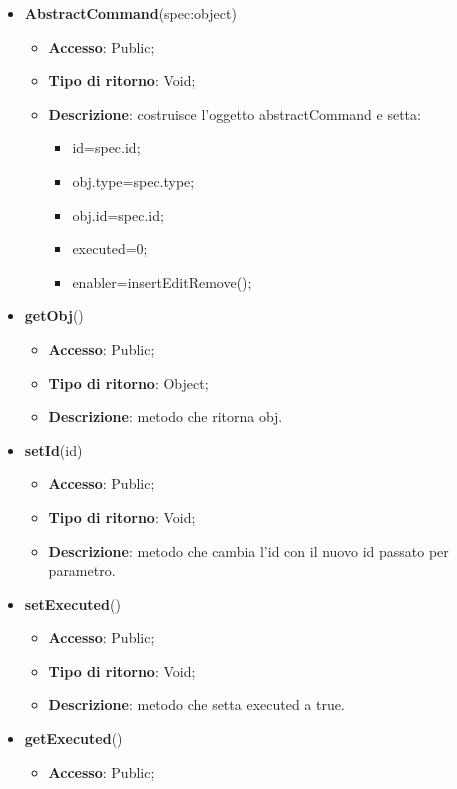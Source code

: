 {{{		
		\begin{itemize}
			\item \textbf{AbstractCommand}(spec:object)
			\begin{itemize}
				\item \textbf{Accesso}: Public;
				\item \textbf{Tipo di ritorno}: Void;
				\item \textbf{Descrizione}: costruisce l’oggetto abstractCommand e setta:\\
				\begin{itemize}
				\item id=spec.id;
				\item obj.type=spec.type;
				\item obj.id=spec.id;
				\item executed=0;
				\item enabler=insertEditRemove();
				\end{itemize}
			\end{itemize}
			\item \textbf{getObj}()
			\begin{itemize}
				\item \textbf{Accesso}: Public;
				\item \textbf{Tipo di ritorno}: Object;
				\item \textbf{Descrizione}: metodo che ritorna obj.
			\end{itemize}
			\item \textbf{setId}(id)
			\begin{itemize}
				\item \textbf{Accesso}: Public;
				\item \textbf{Tipo di ritorno}: Void;
				\item \textbf{Descrizione}: metodo che cambia l'id con il nuovo id passato per parametro.
			\end{itemize}
			\item \textbf{setExecuted}()
			\begin{itemize}
				\item \textbf{Accesso}: Public;
				\item \textbf{Tipo di ritorno}: Void;
				\item \textbf{Descrizione}: metodo che setta executed a true.
			\end{itemize}
			\item \textbf{getExecuted}()
			\begin{itemize}
				\item \textbf{Accesso}: Public;

\end{itemize}
\end{itemize}}}}
